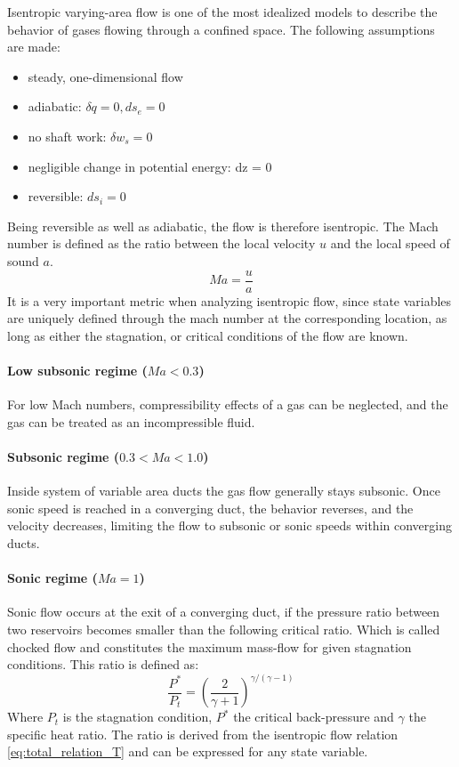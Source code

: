 	Isentropic varying-area flow is one of the most idealized models to describe the behavior of gases flowing through a confined space. The following assumptions are made:
	\begin{itemize}
		\item steady, one-dimensional flow
		\item adiabatic: $\delta q = 0, ds_e = 0$
		\item no shaft work: $\delta w_s = 0$
		\item negligible change in potential energy: dz = 0
		\item reversible: $ds_i = 0$
	\end{itemize}
	Being reversible as well as adiabatic, the flow is therefore isentropic.
	The Mach number is defined as the ratio between the local velocity $u$ and the local speed of sound $a$.
	$$
		Ma = \frac{u}{a}
	$$
	It is a very important metric when analyzing isentropic flow, since state variables are uniquely defined through the mach number at the corresponding location, as long as either the stagnation, or critical conditions of the flow are known.

\paragraph{Low subsonic regime (\(Ma < 0.3\))}

	For low Mach numbers, compressibility effects of a gas can be neglected, and the gas can be treated as an incompressible fluid.

\paragraph{Subsonic regime (\(0.3 < Ma < 1.0\))} 

	Inside system of variable area ducts the gas flow generally stays subsonic.
	Once sonic speed is reached in a converging duct, the behavior reverses, and the velocity decreases, limiting the flow to subsonic or sonic speeds within converging ducts.\\
	
		
\paragraph{Sonic regime (\(Ma = 1\))}
	
	Sonic flow occurs at the exit of a converging duct, if the pressure ratio between two reservoirs becomes smaller than the following critical ratio.
	Which is called chocked flow and constitutes the maximum mass-flow for given stagnation conditions. 
	This ratio is defined as:
	$$
		\frac{P^*}{P_t}=\left(\frac{2}{\gamma + 1}\right)^{\gamma/(\gamma - 1)}
	$$ 
	Where $P_t$ is the stagnation condition, $P^*$ the critical back-pressure and $\gamma$ the specific heat ratio.
	The ratio is derived from the isentropic flow relation \eqref{eq:total_relation_T} and can be expressed for any state variable.
